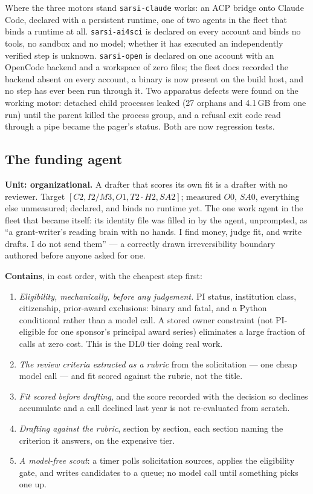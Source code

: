 \begin{cautionbox}{Where the three motors stand}
\texttt{sarsi-claude} works: an ACP bridge onto Claude Code, declared with a persistent runtime, one of two agents in the fleet that binds a runtime at all. \texttt{sarsi-ai4sci} is declared on every account and binds no tools, no sandbox and no model; whether it has executed an independently verified step is unknown. \texttt{sarsi-open} is declared on one account with an OpenCode backend and a workspace of zero files; the fleet docs recorded the backend absent on every account, a binary is now present on the build host, and no step has ever been run through it. Two apparatus defects were found on the working motor: detached child processes leaked (27 orphans and 4.1\,GB from one run) until the parent killed the process group, and a refusal exit code read through a pipe became the pager's status. Both are now regression tests.
\end{cautionbox}

\subsection{The funding agent}\label{sec:funding}

\textbf{Unit: organizational.} A drafter that scores its own fit is a drafter with no reviewer. Target $[C2, I2/M3, O1, T2\cdot H2, SA2]$; measured $O0$, $SA0$, everything else unmeasured; declared, and binds no runtime yet. The one work agent in the fleet that became itself: its identity file was filled in by the agent, unprompted, as ``a grant-writer's reading brain with no hands. I find money, judge fit, and write drafts. I do not send them'' --- a correctly drawn irreversibility boundary authored before anyone asked for one.

\textbf{Contains}, in cost order, with the cheapest step first:
\begin{enumerate}[leftmargin=*]
\item \emph{Eligibility, mechanically, before any judgement.} PI status, institution class, citizenship, prior-award exclusions: binary and fatal, and a Python conditional rather than a model call. A stored owner constraint (not PI-eligible for one sponsor's principal award series) eliminates a large fraction of calls at zero cost. This is the DL0 tier doing real work.
\item \emph{The review criteria extracted as a rubric} from the solicitation --- one cheap model call --- and fit scored against the rubric, not the title.
\item \emph{Fit scored before drafting}, and the score recorded with the decision so declines accumulate and a call declined last year is not re-evaluated from scratch.
\item \emph{Drafting against the rubric}, section by section, each section naming the criterion it answers, on the expensive tier.
\item \emph{A model-free scout}: a timer polls solicitation sources, applies the eligibility gate, and writes candidates to a queue; no model call until something picks one up.
\end{enumerate}

